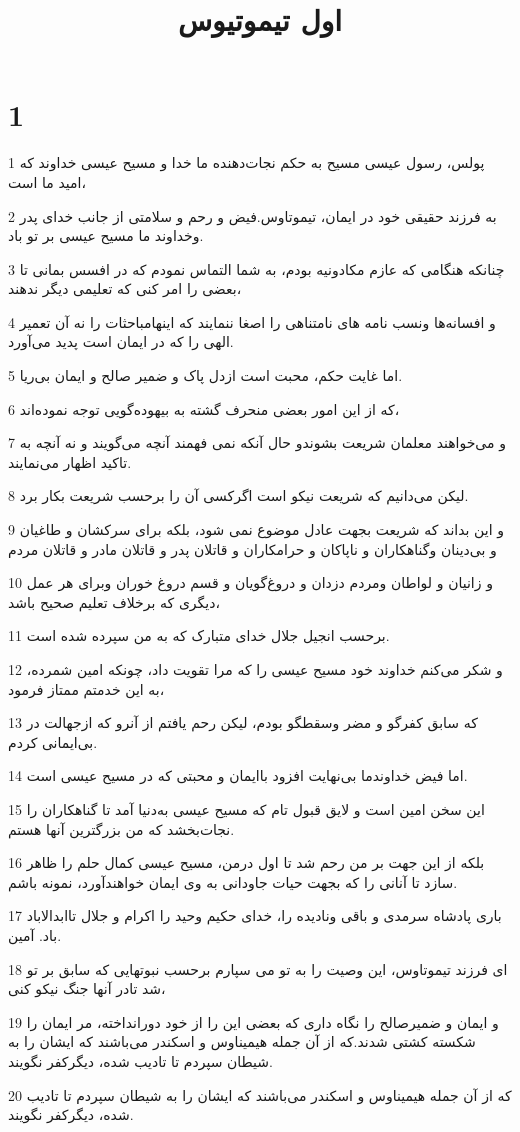 

\title{اول تيموتيوس}


\chapter{1}

\par 1 پولس، رسول عیسی مسیح به حکم نجات‌دهنده ما خدا و مسیح عیسی خداوند که امید ما است،
\par 2 به فرزند حقیقی خود در ایمان، تیموتاوس.فیض و رحم و سلامتی از جانب خدای پدر وخداوند ما مسیح عیسی بر تو باد.
\par 3 چنانکه هنگامی که عازم مکادونیه بودم، به شما التماس نمودم که در افسس بمانی تا بعضی را امر کنی که تعلیمی دیگر ندهند،
\par 4 و افسانه‌ها ونسب نامه های نامتناهی را اصغا ننمایند که اینهامباحثات را نه آن تعمیر الهی را که در ایمان است پدید می‌آورد.
\par 5 اما غایت حکم، محبت است ازدل پاک و ضمیر صالح و ایمان بی‌ریا.
\par 6 که از این امور بعضی منحرف گشته به بیهوده‌گویی توجه نموده‌اند،
\par 7 و می‌خواهند معلمان شریعت بشوندو حال آنکه نمی فهمند آنچه می‌گویند و نه آنچه به تاکید اظهار می‌نمایند.
\par 8 لیکن می‌دانیم که شریعت نیکو است اگرکسی آن را برحسب شریعت بکار برد.
\par 9 و این بداند که شریعت بجهت عادل موضوع نمی شود، بلکه برای سرکشان و طاغیان و بی‌دینان وگناهکاران و ناپاکان و حرامکاران و قاتلان پدر و قاتلان مادر و قاتلان مردم
\par 10 و زانیان و لواطان ومردم دزدان و دروغ‌گویان و قسم دروغ خوران وبرای هر عمل دیگری که برخلاف تعلیم صحیح باشد،
\par 11 برحسب انجیل جلال خدای متبارک که به من سپرده شده است.
\par 12 و شکر می‌کنم خداوند خود مسیح عیسی را که مرا تقویت داد، چونکه امین شمرده، به این خدمتم ممتاز فرمود،
\par 13 که سابق کفرگو و مضر وسقطگو بودم، لیکن رحم یافتم از آنرو که ازجهالت در بی‌ایمانی کردم.
\par 14 اما فیض خداوندما بی‌نهایت افزود با‌ایمان و محبتی که در مسیح عیسی است.
\par 15 این سخن امین است و لایق قبول تام که مسیح عیسی به‌دنیا آمد تا گناهکاران را نجات‌بخشد که من بزرگترین آنها هستم.
\par 16 بلکه از این جهت بر من رحم شد تا اول درمن، مسیح عیسی کمال حلم را ظاهر سازد تا آنانی را که بجهت حیات جاودانی به وی ایمان خواهند‌آورد، نمونه باشم.
\par 17 باری پادشاه سرمدی و باقی ونادیده را، خدای حکیم وحید را اکرام و جلال تاابدالاباد باد. آمین.
\par 18 ‌ای فرزند تیموتاوس، این وصیت را به تو می سپارم برحسب نبوتهایی که سابق بر تو شد تادر آنها جنگ نیکو کنی،
\par 19 و ایمان و ضمیرصالح را نگاه داری که بعضی این را از خود دورانداخته، مر ایمان را شکسته کشتی شدند.که از آن جمله هیمیناوس و اسکندر می‌باشند که ایشان را به شیطان سپردم تا تادیب شده، دیگرکفر نگویند.
\par 20 که از آن جمله هیمیناوس و اسکندر می‌باشند که ایشان را به شیطان سپردم تا تادیب شده، دیگرکفر نگویند.


